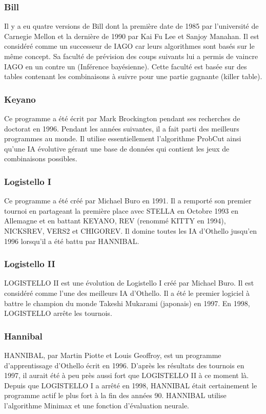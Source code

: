 \documentclass[a4paper,12pt]{article}
\begin{document}
\subsubsection{Bill}
Il y a eu quatre versions de Bill \cite{bill} dont la première date de 1985 par l'université de Carnegie Mellon et la dernière de 1990 par Kai Fu Lee et Sanjoy Manahan. 
Il est considéré comme un successeur de IAGO car leurs algorithmes sont basés sur le même concept. Sa faculté de prévision des coups suivants lui a permis de vaincre IAGO en un contre un (Inférence bayésienne).
Cette faculté est basée sur des tables contenant les combinaisons  à suivre pour une partie gagnante (killer table).

\subsubsection{Keyano}
Ce programme \cite{keyano} a été écrit par Mark Brockington pendant ses recherches de doctorat en 1996. Pendant les années suivantes, il a fait parti des meilleurs programmes au monde. 
Il utilise essentiellement l'algorithme ProbCut ainsi qu'une IA évolutive gérant une base de données qui contient les jeux de combinaisons possibles.  


\subsubsection{Logistello I}
Ce programme \cite{logistello} a été créé par Michael
Buro en 1991. Il a remporté son premier tournoi en partageant la
première place avec STELLA en Octobre 1993 en Allemagne et en battant KEYANO,  REV (renommé KITTY en 1994), NICKSREV, VERS2 et CHIGOREV. Il domine toutes les IA d'Othello jusqu'en 1996 lorsqu'il a été battu par HANNIBAL.

\subsubsection{Logistello II}
LOGISTELLO II \cite{logistello} est une évolution de Logistello I créé par Michael Buro. Il est considéré comme l'une des meilleurs IA d'Othello. Il a été le premier logiciel à battre le champion du monde Takeshi Mukarami (japonais) en 1997. En 1998, LOGISTELLO arrête les tournois.


\subsubsection{Hannibal}
HANNIBAL, par Martin Piotte et Louis Geoffroy, est un programme d'apprentissage d'Othello écrit en 1996. D'après les résultats des tournois en 1997, il aurait été à peu près aussi fort que LOGISTELLO II à ce moment là. Depuis que LOGISTELLO I a arrêté en 1998, HANNIBAL était certainement le programme actif le plus fort à la fin des années 90. HANNIBAL utilise l'algorithme Minimax et une fonction d'évaluation neurale.
\end{document}
